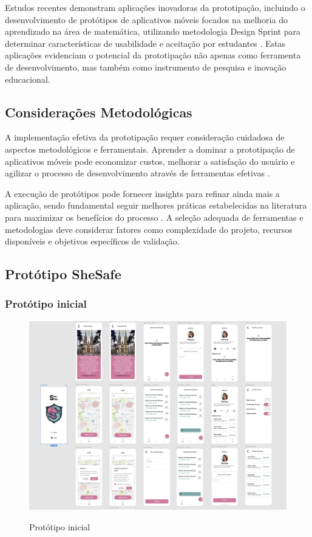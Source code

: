 Estudos recentes demonstram aplicações inovadoras da prototipação, incluindo o desenvolvimento de protótipos de aplicativos móveis focados na melhoria do aprendizado na área de matemática, utilizando metodologia Design Sprint para determinar características de usabilidade e aceitação por estudantes \cite{salud_ciencia_prototyping}. Estas aplicações evidenciam o potencial da prototipação não apenas como ferramenta de desenvolvimento, mas também como instrumento de pesquisa e inovação educacional.

\subsection{Considerações Metodológicas}

A implementação efetiva da prototipação requer consideração cuidadosa de aspectos metodológicos e ferramentais. Aprender a dominar a prototipação de aplicativos móveis pode economizar custos, melhorar a satisfação do usuário e agilizar o processo de desenvolvimento através de ferramentas efetivas \cite{decode_best_practices}.

A execução de protótipos pode fornecer insights para refinar ainda mais a aplicação, sendo fundamental seguir melhores práticas estabelecidas na literatura para maximizar os benefícios do processo \cite{ossisto_guide}. A seleção adequada de ferramentas e metodologias deve considerar fatores como complexidade do projeto, recursos disponíveis e objetivos específicos de validação.


\subsection{Protótipo SheSafe}

\subsubsection{Protótipo inicial}
\begin{figure}[h]
	\begin{center}
		\includegraphics[width=0.8\linewidth]{images/prototipo-inicial.png}\\
	\end{center}
	\caption[Protótipo inicial]{Protótipo inicial}
	\label{fig:prototipo-inicial}
\end{figure}
\pagebreak

